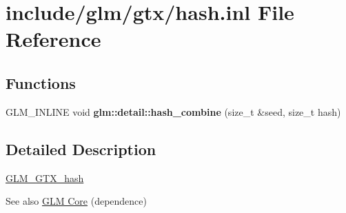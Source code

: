 \hypertarget{hash_8inl}{}\section{include/glm/gtx/hash.inl File Reference}
\label{hash_8inl}
\subsection*{Functions}
\begin{DoxyCompactItemize}
\item 
\mbox{\label{hash_8inl_a391b3eb8d7f4662a1b31046bd69f2755}} 
G\+L\+M\+\_\+\+I\+N\+L\+I\+NE void {\bfseries glm\+::detail\+::hash\+\_\+combine} (size\+\_\+t \&seed, size\+\_\+t hash)
\end{DoxyCompactItemize}


\subsection{Detailed Description}
\hyperlink{group__gtx__hash}{G\+L\+M\+\_\+\+G\+T\+X\+\_\+hash}

\begin{DoxySeeAlso}{See also}
\hyperlink{group__core}{G\+L\+M Core} (dependence) 
\end{DoxySeeAlso}
